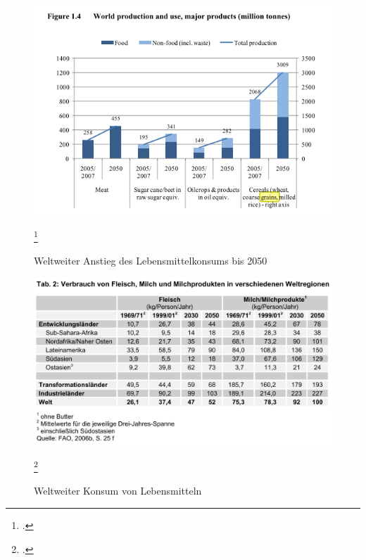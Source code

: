 \documentclass{scrartcl}
\begin{document}
\begin{figure}[htbp]
\centering
\includegraphics[width=16cm]{image_folder/2030S8.png}
\caption{Weltweiter Anstieg des Lebensmittelkonsums bis 2050}
\label{fig:konsumbis2050}\footcite[vgl.][S.8]{FAO2006World2030/2050} 
\end{figure}

\begin{figure}[htbp]
\centering
\includegraphics[width=16cm]{image_folder/KonsumWeltweit.png}
\caption{Weltweiter Konsum von Lebensmitteln}
\label{fig:konsumweltweit}\footcite[S.4f]{VonKoerber2008Globale-trends}
\end{figure}
\end{document}

